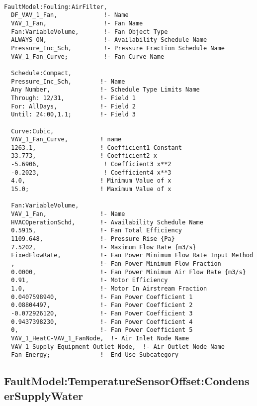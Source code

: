 \begin{lstlisting}

FaultModel:Fouling:AirFilter,
  DF_VAV_1_Fan,             !- Name
  VAV_1_Fan,                !- Fan Name
  Fan:VariableVolume,       !- Fan Object Type
  ALWAYS_ON,                !- Availability Schedule Name
  Pressure_Inc_Sch,         !- Pressure Fraction Schedule Name
  VAV_1_Fan_Curve;          !- Fan Curve Name

  Schedule:Compact,
  Pressure_Inc_Sch,        !- Name
  Any Number,              !- Schedule Type Limits Name
  Through: 12/31,          !- Field 1
  For: AllDays,            !- Field 2
  Until: 24:00,1.1;        !- Field 3

  Curve:Cubic,        
  VAV_1_Fan_Curve,         ! name     
  1263.1,                  ! Coefficient1 Constant        
  33.773,                  ! Coefficient2 x       
  -5.6906,                  ! Coefficient3 x**2        
  -0.2023,                  ! Coefficient4 x**3        
  4.0,                     ! Minimum Value of x       
  15.0;                    ! Maximum Value of x       

  Fan:VariableVolume,
  VAV_1_Fan,               !- Name
  HVACOperationSchd,       !- Availability Schedule Name
  0.5915,                  !- Fan Total Efficiency
  1109.648,                !- Pressure Rise {Pa}
  7.5202,                  !- Maximum Flow Rate {m3/s}
  FixedFlowRate,           !- Fan Power Minimum Flow Rate Input Method
  ,                        !- Fan Power Minimum Flow Fraction
  0.0000,                  !- Fan Power Minimum Air Flow Rate {m3/s}
  0.91,                    !- Motor Efficiency
  1.0,                     !- Motor In Airstream Fraction
  0.0407598940,            !- Fan Power Coefficient 1
  0.08804497,              !- Fan Power Coefficient 2
  -0.072926120,            !- Fan Power Coefficient 3
  0.9437398230,            !- Fan Power Coefficient 4
  0,                       !- Fan Power Coefficient 5
  VAV_1_HeatC-VAV_1_FanNode,  !- Air Inlet Node Name
  VAV_1 Supply Equipment Outlet Node,  !- Air Outlet Node Name
  Fan Energy;              !- End-Use Subcategory
\end{lstlisting}


\subsection{FaultModel:TemperatureSensorOffset:CondenserSupplyWater}\label{faultmodeltemperaturesensoroffsetcondensersupplywater}

